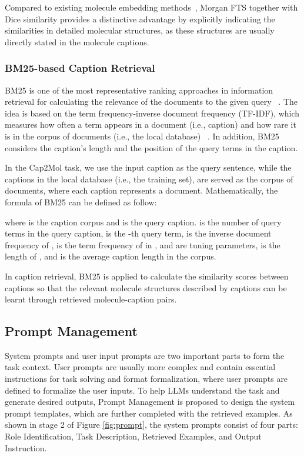 \documentclass{article}
\theoremstyle{plain}
\theoremstyle{definition}
\theoremstyle{remark}
\begin{document}
Compared to existing molecule embedding methods~\cite{coupry2022application}, Morgan FTS together with Dice similarity provides a distinctive advantage by explicitly indicating the similarities in detailed molecular structures, as these structures are usually directly stated in the molecule captions.



\subsubsection{BM25-based Caption Retrieval} 
BM25 is one of the most representative ranking approaches in information retrieval for calculating the relevance of the documents to the given query ~\cite{robertson2009probabilistic}. 
The idea is based on the term frequency-inverse document frequency (TF-IDF), which measures how often a term appears in a document (i.e., caption) and how rare it is in the corpus of documents (i.e., the local database) ~\cite{aizawa2003information}. In addition, BM25 considers the caption's length and the position of the query terms in the caption.

In the Cap2Mol task, we use the input caption as the query sentence, while the captions in the local database (i.e., the training set), are served as the corpus of documents, where each caption represents a document.
Mathematically, the formula of BM25 can be defined as follow:

where  is the caption corpus and  is the query caption.  is the number of query terms in the query caption,  is the -th query term,  is the inverse document frequency of ,  is the term frequency of  in ,  and  are tuning parameters,  is the length of , and  is the average caption length in the corpus.

In caption retrieval, BM25 is applied to calculate the similarity scores between captions so that the relevant molecule structures described by captions can be learnt through retrieved molecule-caption pairs.


\subsection{Prompt Management}
System prompts and user input prompts are two important parts to form the task context. User prompts are usually more complex and contain essential instructions for task solving and format formalization, where user prompts are defined to formalize the user inputs. To help LLMs understand the task and generate desired outputs, Prompt Management is proposed to design the system prompt templates, which are further completed with the retrieved examples. 
As shown in stage 2 of Figure \ref{fig:prompt}, the system prompts consist of four parts: Role Identification, Task Description, Retrieved Examples, and Output Instruction.
\end{document}
